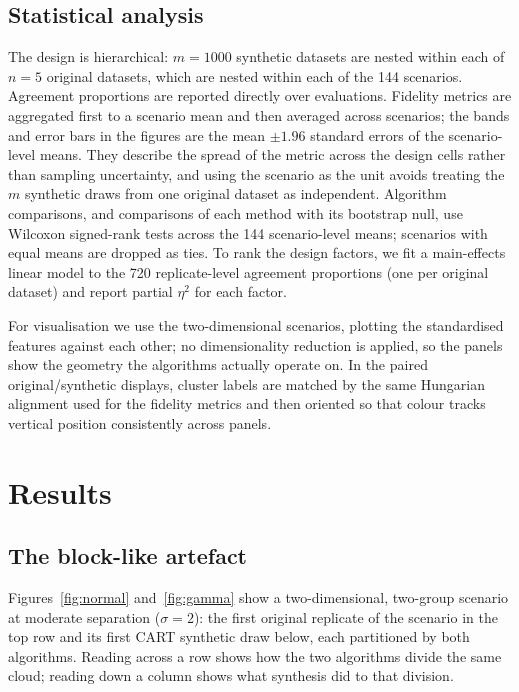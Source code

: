 \documentclass[pdflatex,referee]{sn-jnl}
\begin{document}
\subsection{Statistical analysis}
\label{sec:analysis}

The design is hierarchical: $m = 1000$ synthetic datasets are nested within
each of $n = 5$ original datasets, which are nested within each of the 144
scenarios. Agreement proportions are reported directly over evaluations.
Fidelity metrics are aggregated first to a scenario mean and then averaged
across scenarios; the bands and error bars in the figures are the mean
$\pm 1.96$ standard errors of the scenario-level means. They describe the
spread of the metric across the design cells rather than sampling
uncertainty, and using the scenario as the unit avoids treating the $m$
synthetic draws from one original dataset as independent. Algorithm
comparisons, and comparisons of each method with its bootstrap null, use
Wilcoxon signed-rank tests across the 144 scenario-level means; scenarios with
equal means are dropped as ties. To rank the design factors, we fit a
main-effects linear model to the 720 replicate-level agreement proportions
(one per original dataset) and report partial $\eta^2$ for each factor.

For visualisation we use the two-dimensional scenarios, plotting the
standardised features against each other; no dimensionality reduction is
applied, so the panels show the geometry the algorithms actually operate on. In
the paired original/synthetic displays, cluster labels are matched by the same
Hungarian alignment used for the fidelity metrics and then oriented so that
colour tracks vertical position consistently across panels.

\section{Results}

\subsection{The block-like artefact}

Figures~\ref{fig:normal} and~\ref{fig:gamma} show a two-dimensional,
two-group scenario at moderate separation ($\sigma = 2$): the first original
replicate of the scenario in the top row and its first CART synthetic draw
below, each partitioned by both algorithms. Reading across a row shows how the
two algorithms divide the same cloud; reading down a column shows what
synthesis did to that division.
\end{document}

